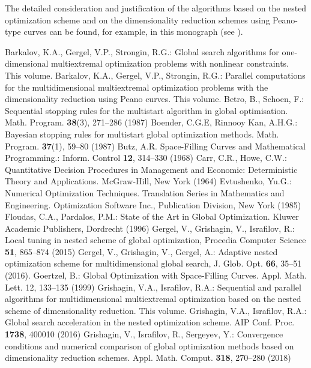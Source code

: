 The detailed consideration and justification of the algorithms based on the nested optimization scheme and on the dimensionality reduction schemes using Peano-type curves can be found, for example, in this monograph (see \cite{1_BarGerStrChap6, 1_GriIsrChap5}). 
% 
\begin{thebibliography}{99.}
 Barkalov, K.A., Gergel, V.P., Strongin, R.G.: Global search algorithms for one-dimensional multiextremal optimization problems with nonlinear constraints. This volume.
 Barkalov, K.A., Gergel, V.P., Strongin, R.G.: Parallel computations for the multidimensional multiextremal optimization problems with the dimensionality reduction using Peano curves. This volume.
 Betro, B., Schoen, F.: Sequential stopping rules for the multistart algorithm in global optimisation. Math. Program. \textbf{38}(3), 271--286 (1987)
	Boender, C.G.E, Rinnooy Kan, A.H.G.: Bayesian stopping rules for multistart global optimization methods. Math. Program. \textbf{37}(1), 59--80 (1987)
	Butz, A.R. Space-Filling Curves and Mathematical Programming.: Inform. Control \textbf{12}, 314--330 (1968)
	Carr, C.R., Howe, C.W.: Quantitative Decision Procedures in Management and Economic: Deterministic Theory and Applications. McGraw-Hill, New York (1964)
	Evtushenko, Yu.G.: Numerical Optimization Techniques. Translation Series in Mathematics and Engineering. Optimization Software  Inc., Publication Division, New York (1985)
 Floudas, C.A., Pardalos, P.M.: State of the Art in Global Optimization. Kluwer Academic Publishers, Dordrecht (1996)
 Gergel, V.,  Grishagin, V., Israfilov, R.: Local tuning in nested scheme of global optimization, Procedia Computer Science \textbf{51}, 865--874 (2015) 
	Gergel, V., Grishagin, V., Gergel, A.: Adaptive nested optimization scheme for multidimensional global search, J. Glob. Opt. \textbf{66}, 35–51 (2016).
	Goertzel, B.: Global Optimization with Space-Filling Curves. Appl. Math. Lett. 12, 133--135 (1999)
Grishagin, V.A., Israfilov, R.A.: Sequential and parallel algorithms for multidimensional multiextremal optimization based on the nested scheme of dimensionality
reduction. This volume.
	Grishagin, V.A., Israfilov, R.A.: Global search acceleration in the nested optimization scheme. AIP Conf. Proc. \textbf{1738}, 400010 (2016)
Grishagin, V.,  Israfilov, R., Sergeyev, Y.: Convergence conditions and numerical comparison of global optimization methods based on dimensionality reduction schemes. Appl. Math.  Comput. \textbf{318}, 270--280 (2018)


\end{thebibliography}
